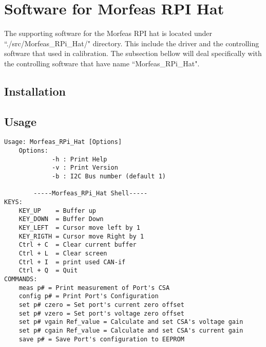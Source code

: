 \section{Software for Morfeas RPI Hat}
The supporting software for the Morfeas RPI hat is located under ``./src/Morfeas\_RPi\_Hat/" directory. This include the driver and the controlling software that used in calibration.
The subsection bellow will deal specifically with the controlling software that have name ``Morfeas\_RPi\_Hat".

\subsection{Installation}

\subsection{Usage}
\begin{lstlisting}[frame=single,caption=Usage of ``Morfeas\_RPi\_Hat", label=lst:usage]
Usage: Morfeas_RPi_Hat [Options]
    Options:
             -h : Print Help
             -v : Print Version
             -b : I2C Bus number (default 1)

        -----Morfeas_RPi_Hat Shell-----
KEYS:
    KEY_UP    = Buffer up
    KEY_DOWN  = Buffer Down
    KEY_LEFT  = Cursor move left by 1
    KEY_RIGTH = Cursor move Right by 1
    Ctrl + C  = Clear current buffer
    Ctrl + L  = Clear screen
    Ctrl + I  = print used CAN-if
    Ctrl + Q  = Quit
COMMANDS:
    meas p# = Print measurement of Port's CSA
    config p# = Print Port's Configuration
    set p# czero = Set port's current zero offset
    set p# vzero = Set port's voltage zero offset
    set p# vgain Ref_value = Calculate and set CSA's voltage gain
    set p# cgain Ref_value = Calculate and set CSA's current gain
    save p# = Save Port's configuration to EEPROM
\end{lstlisting}
